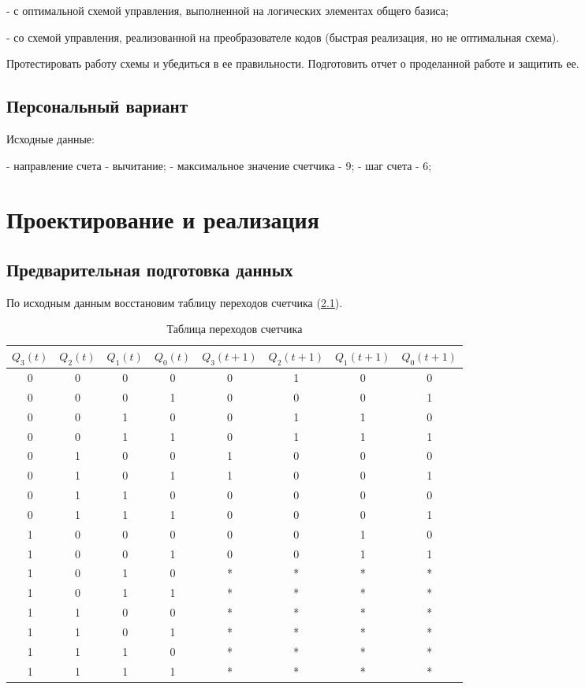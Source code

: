 \documentclass[14pt, a4paper]{extreport}
\begin{document}
- с оптимальной схемой управления, выполненной на логических элементах общего базиса;

- со схемой управления, реализованной на преобразователе кодов (быстрая реализация, но не оптимальная схема).

Протестировать работу схемы и убедиться в ее правильности. Подготовить отчет о проделанной работе и защитить ее.

\section{Персональный вариант}
Исходные данные:

- направление счета - вычитание;
- максимальное значение счетчика - 9;
- шаг счета - 6;

\chapter{Проектирование и реализация}
\section{Предварительная подготовка данных}
По исходным данным восстановим таблицу переходов счетчика (\cref{tab:states}).

\begin{table}[H]
	\caption{Таблица переходов счетчика}
	\label{tab:states}
	\begin{tabular}{|c|c|c|c|c|c|c|c|}
		\hline
		$Q_3(t)$ & $Q_2(t)$ & $Q_1(t)$ & $Q_0(t)$ & $Q_3(t + 1)$ & $Q_2(t + 1)$ & $Q_1(t + 1)$ & $Q_0(t + 1)$ \\
		\hline
		0 & 0 & 0 & 0 & 0 & 1 & 0 & 0 \\
		\hline
		0 & 0 & 0 & 1 & 0 & 0 & 0 & 1 \\
		\hline
		0 & 0 & 1 & 0 & 0 & 1 & 1 & 0 \\
		\hline
		0 & 0 & 1 & 1 & 0 & 1 & 1 & 1 \\
		\hline
		0 & 1 & 0 & 0 & 1 & 0 & 0 & 0 \\
		\hline
		0 & 1 & 0 & 1 & 1 & 0 & 0 & 1 \\
		\hline
		0 & 1 & 1 & 0 & 0 & 0 & 0 & 0 \\
		\hline
		0 & 1 & 1 & 1 & 0 & 0 & 0 & 1 \\
		\hline
		1 & 0 & 0 & 0 & 0 & 0 & 1 & 0 \\
		\hline
		1 & 0 & 0 & 1 & 0 & 0 & 1 & 1 \\
		\hline
		1 & 0 & 1 & 0 & * & * & * & * \\
		\hline
		1 & 0 & 1 & 1 & * & * & * & * \\
		\hline
		1 & 1 & 0 & 0 & * & * & * & * \\
		\hline
		1 & 1 & 0 & 1 & * & * & * & * \\
		\hline
		1 & 1 & 1 & 0 & * & * & * & * \\
		\hline
		1 & 1 & 1 & 1 & * & * & * & * \\
		\hline
	\end{tabular}
\end{table}
\end{document}
